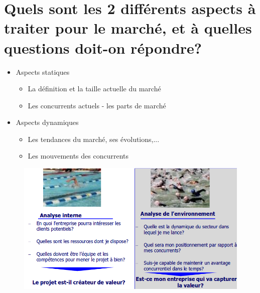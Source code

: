 \documentclass{article}
\begin{document}
\section{Quels sont les 2 différents aspects à traiter pour le marché, et à quelles questions doit-on répondre?}
\begin{itemize}
\item Aspects statiques
\begin{itemize}
\item La définition et la taille actuelle du marché
\item Les concurrents actuels - les parts de marché
\end{itemize}
\item Aspects dynamiques
\begin{itemize}
\item Les tendances du marché, ses évolutions,...
\item Les mouvements des concurrents
\end{itemize}
\end{itemize}
\begin{figure}[H]
	\centering
	\includegraphics[width=14cm]{marcheQuestions.png}
\end{figure}
\end{document}
